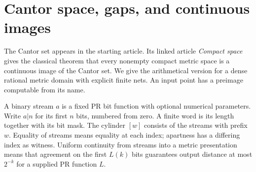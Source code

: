 \section{Cantor space, gaps, and continuous images}\label{sec:cantor}
The Cantor set appears in the starting article. Its linked article
\emph{Compact space} gives the classical theorem that every nonempty compact
metric space is a continuous image of the Cantor set. We give the
arithmetical version for a dense rational metric domain with explicit finite
nets. An input point has a preimage computable from its name.

A binary stream $a$ is a fixed PR bit function with optional numerical
parameters. Write $a|n$ for its first $n$ bits, numbered from zero. A finite
word is its length together with its bit mask. The cylinder $[w]$ consists of
the streams with prefix $w$. Equality of streams means equality at each
index; apartness has a differing index as witness. Uniform continuity from
streams into a metric presentation means that agreement on the first
$L(k)$ bits guarantees output distance at most $2^{-k}$ for a supplied PR
function $L$.

